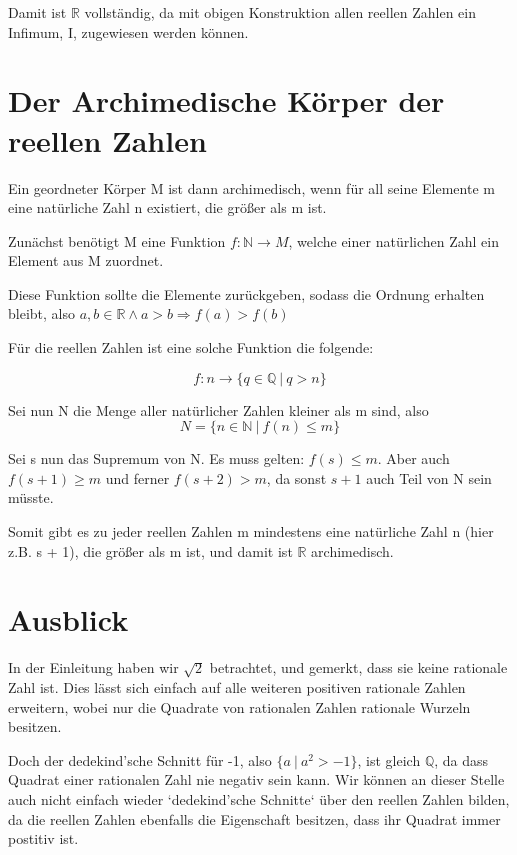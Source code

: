 \documentclass[12pt]{article}
\begin{document}
    Damit ist $\mathbb{R}$ vollständig, da mit obigen Konstruktion allen reellen Zahlen ein Infimum, I, zugewiesen werden
    können.

    \section{Der Archimedische Körper der reellen Zahlen}

    Ein geordneter Körper M ist dann archimedisch, wenn für all seine Elemente m eine natürliche Zahl n existiert,
    die größer als m ist.

    Zunächst benötigt M eine Funktion $f: \mathbb{N} \rightarrow M$,
    welche einer natürlichen Zahl ein Element aus M zuordnet.

    Diese Funktion sollte die Elemente zurückgeben, sodass die Ordnung erhalten bleibt, also
    $a, b \in \mathbb{R} \land a > b \Rightarrow f(a) > f(b)$

    Für die reellen Zahlen ist eine solche Funktion die folgende:

    \[f: n \rightarrow \{q \in \mathbb{Q} \mspace{4mu} | \mspace{4mu} q > n\}\]

    Sei nun N die Menge aller natürlicher Zahlen kleiner als m sind, also
    \[N = \{n \in \mathbb{N} \mspace{4mu} | \mspace{4mu} f(n) \le m\}\]

    Sei s nun das Supremum von N.
    Es muss gelten: $f(s) \le m$.
    Aber auch $f(s+1) \ge m$ und ferner $f(s+2) > m$, da sonst $s+1$ auch Teil von N sein müsste.

    Somit gibt es zu jeder reellen Zahlen m mindestens eine natürliche Zahl n (hier z.B. s + 1), die größer als m ist,
    und  damit ist $\mathbb{R}$ archimedisch.

    \newpage

    \section{Ausblick}

    In der Einleitung haben wir $\sqrt{2}$ betrachtet, und gemerkt, dass sie keine rationale Zahl ist.
    Dies lässt sich einfach auf alle weiteren positiven rationale Zahlen erweitern, wobei nur die Quadrate von rationalen Zahlen
    rationale Wurzeln besitzen.

    Doch der dedekind'sche Schnitt für -1, also $\{a \mspace{4mu} | \mspace{4mu} a^2 > -1\}$, ist gleich $\mathbb{Q}$,
    da dass Quadrat einer rationalen Zahl nie negativ sein kann.
    Wir können an dieser Stelle auch nicht einfach wieder `dedekind'sche Schnitte` über den reellen Zahlen bilden,
    da die reellen Zahlen ebenfalls die Eigenschaft besitzen, dass ihr Quadrat immer postitiv ist.
\end{document}
